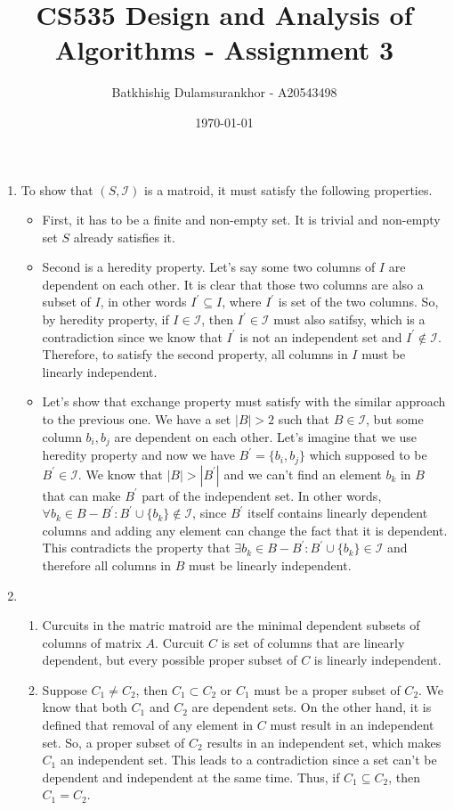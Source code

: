 \documentclass{article}
\title{CS535 Design and Analysis of Algorithms - Assignment 3}
\author{Batkhishig Dulamsurankhor - A20543498}
\date{\today} %
\begin{document}
\maketitle

\begin{enumerate}
  \item To show that $(S,\mathcal{I})$ is a matroid, it must satisfy the following properties.

  \begin{itemize}
    \item First, it has to be a finite and non-empty set. It is trivial and non-empty set $S$ already satisfies it.
    \item Second is a heredity property. Let's say some two columns of $I$ are dependent on each other.
    It is clear that those two columns are also a subset of $I$, in other words $I^\prime\subseteq I$, where $I^\prime$ is set of the two columns.
    So, by heredity property, if $I\in\mathcal{I}$, then $I^\prime\in\mathcal{I}$ must also satifsy, which is a contradiction since we know that $I^\prime$ is not an independent set and $I^\prime\notin\mathcal{I}$.
    Therefore, to satisfy the second property, all columns in $I$ must be linearly independent.
    \item Let's show that exchange property must satisfy with the similar approach to the previous one.
    We have a set $|B|>2$ such that $B\in\mathcal{I}$, but some column $b_i,b_j$ are dependent on each other.
    Let's imagine that we use heredity property and now we have $B^\prime=\{b_i,b_j\}$ which supposed to be $B^\prime\in\mathcal{I}$.
    We know that $|B|>|B^\prime|$ and we can't find an element $b_k$ in $B$ that can make $B^\prime$ part of the independent set.
    In other words, $\forall b_k \in B-B^\prime:B^\prime\cup\{b_k\}\notin\mathcal{I}$, since $B^\prime$ itself contains linearly dependent columns and adding any element can change the fact that it is dependent.
    This contradicts the property that $\exists b_k \in B-B^\prime:B^\prime\cup\{b_k\}\in\mathcal{I}$ and therefore all columns in $B$ must be linearly independent.
  \end{itemize}

  \item
    \begin{enumerate}
      \item Curcuits in the matric matroid are the minimal dependent subsets of columns of matrix $A$.
      Curcuit $C$ is set of columns that are linearly dependent, but every possible proper subset of $C$ is linearly independent.
      \item Suppose $C_1\neq C_2$, then $C_1\subset C_2$ or $C_1$ must be a proper subset of $C_2$.
      We know that both $C_1$ and $C_2$ are dependent sets.
      On the other hand, it is defined that removal of any element in $C$ must result in an independent set.
      So, a proper subset of $C_2$ results in an independent set, which makes $C_1$ an independent set.
      This leads to a contradiction since a set can't be dependent and independent at the same time.
      Thus, if $C_1\subseteq C_2$, then $C_1=C_2$.


\end{enumerate}
\end{enumerate}
\end{document}
